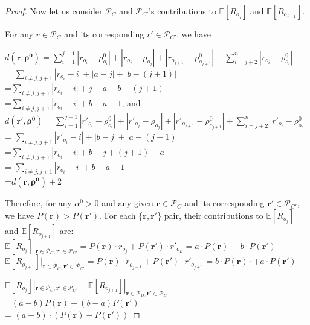 \documentclass[11pt, oneside]{article}   	%
\begin{document}
\begin{proof}
Now let us consider $\mathcal{P}_C$ and $\mathcal{P}_{C'}$'s contributions to $\mathbb{E}[R_{o_{j}}]$ and $\mathbb{E}[R_{o_{j+1}}]$.


For any $r \in \mathcal{P}_C$ and its corresponding $r' \in \mathcal{P}_{C'}$, we have

$d(\bm{r}, \bm{\rho^0}) = \sum\limits_{i=1}^{j-1}|r_{o_i} - \rho^0_{o_i}| + |r_{o_j} - \rho_{o_j}| + |r_{o_{j+1}} - \rho^0_{o_{j+1}}| + \sum\limits_{i = j+2}^{n}|r_{o_i} - \rho^0_{o_{i}}|$ \\
= $\sum\limits_{i \neq j, j+1} |r_{o_i} - i| + |a-j| + |b - (j+1)|$\\
=$\sum\limits_{i \neq j, j+1} |r_{o_i} - i| + j-a + b-(j+1)$\\
=$\sum\limits_{i \neq j, j+1} |r_{o_i} - i| + b-a -1 $, and \\

$d(\bm{r'}, \bm{\rho^0}) = \sum\limits_{i=1}^{j-1}|r'_{o_i} - \rho^0_{o_i}| + |r'_{o_j} - \rho_{o_j}| + |r'_{o_{j+1}} - \rho^0_{o_{j+1}}| + \sum\limits_{i = j+2}^{n}|r'_{o_i} - \rho^0_{o_{i}}|$ \\
= $\sum\limits_{i \neq j, j+1} |r'_{o_i} - i| + |b-j| + |a - (j+1)|$\\
=$\sum\limits_{i \neq j, j+1} |r_{o_i} - i| + b-j + (j+1)- a$ \\
= $\sum\limits_{i \neq j, j+1} |r_{o_i} - i| + b-a+1 $\\
=$d(\bm{r}, \bm{\rho^0}) +2$

Therefore, for any $\alpha^0 > 0$ and any given $\bm{r} \in \mathcal{P}_C$ and its corresponding $\bm{r'} \in \mathcal{P}_{C'}$, we have $P(\bm{r}) > P(\bm{r'}) $. For each \{$\bm{r}, \bm{r'}$\} pair, their contributions to $\mathbb{E}[R_{o_j}]$ and $\mathbb{E}[R_{o_{j+1}}]$ are: \\
$\mathbb{E}[R_{o_j}]|_{\bm{r}\in \mathcal{P}_C,\bm{r'}\in \mathcal{P}_{C'}} = P(\bm{r})\cdot r_{o_j} + P(\bm{r'})\cdot r'_{o_B} = a\cdot P(\bm{r})\cdot + b\cdot P(\bm{r'}) $ \\
$\mathbb{E}[R_{o_{j+1}}]|_{\bm{r}\in \mathcal{P}_C,\bm{r'}\in \mathcal{P}_{C'}} = P(\bm{r})\cdot r_{o_{j+1}} + P(\bm{r'})\cdot r'_{o_{j+1}} = b\cdot P(\bm{r})\cdot + a\cdot P(\bm{r'})$ 

$\mathbb{E}[R_{o_j}]|_{\bm{r}\in \mathcal{P}_C,\bm{r'}\in \mathcal{P}_{C'}} - \mathbb{E}[R_{o_{j+1}}]|_{\bm{r}\in \mathcal{P}_B,\bm{r'}\in \mathcal{P}_{B'}}$ \\ =$(a-b)P(\bm{r}) + (b-a)P(\bm{r'})$ \\
= $(a-b)\cdot (P(\bm{r}) - P(\bm{r'}))$


\end{proof}
\end{document}
